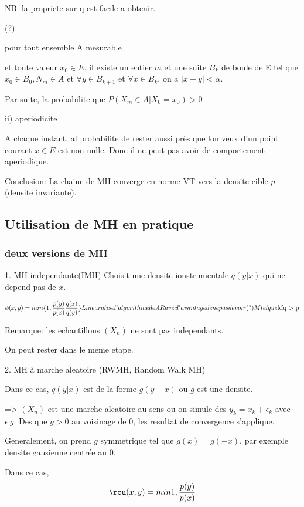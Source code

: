 \documentclass{article}
\begin{document}
NB: la propriete sur q est facile a obtenir.

(?)

pour tout ensemble A mesurable 

et toute valeur $x_0 \in E$, il existe un entier $m$ et une suite $B_k$ de boule de E tel que $x_0\in B_0, N_m \in A$ et $\forall y \in B_{k+1}$ et $\forall x \in B_k$, on a $|x-y|<\alpha$.

Par suite, la probabilite que $P(X_m\in A| X_0 = x_0)>0$

ii) aperiodicite

A chaque instant, al probabilite de rester aussi pr\`es que lon veux d'un point courant $x\in E$ est non nulle. Donc il ne peut pas avoir de comportement aperiodique. 

Conclusion: La chaine de MH converge en norme VT vers la densite cible $p$(densite invariante).


\subsection{Utilisation de MH en pratique}
\subsubsection{deux versions de MH}

1. MH independante(IMH)
Choisit une densite ionstrumentale $q(y|x)$ qui ne depend pas de $x$.


\begin{equation}
\phi(x,y)=min\{1, \frac{p(y)}{p(x)}\frac{q(x)}{q(y)}\}

Linearalise l'algorithme de AR avec l'avantage de ne pas devoir (?) M tel que $Mq > p$
\end{equation}

Remarque: les echantillons $(X_n)$ ne sont pas independants.

On peut rester dans le meme etape.

2. MH \`a marche aleatoire (RWMH, Random Walk MH)

Dans ce cas, $q(y|x)$ est de la forme $g(y-x)$ ou $g$ est une densite.

=> $(X_n)$ est une marche aleatoire au sens ou on simule des $y_k=x_k+\epsilon_k$ avec $\epsilon ~ g$. 
Des que $g>0$ au voisinage de 0, les resultat de convergence s'applique.

Generalement, on prend $g$ symmetrique tel que $g(x) = g(-x)$, par exemple densite gausienne centr\'ee au 0.

Dans ce cas,
\begin{equation}
\rou(x,y)=min{1,\frac{p(y)}{p(x)}}
\end{equation}
\end{document}
